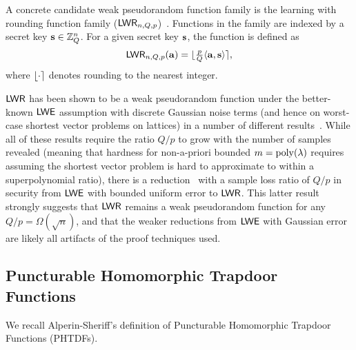 A concrete candidate weak pseudorandom function family is the learning with
rounding function family
($\mathsf{LWR}_{n,Q,p}$)~\cite{DBLP:conf/eurocrypt/BanerjeePR12}.
Functions in the family are indexed by a secret key $\mathbf{s} \in
\mathbb{Z}_Q^n$. For a given secret key $\mathbf{s}$, the function  is defined as 
\[\mathsf{LWR}_{n,Q,p}(\mathbf{a})=\lfloor\tfrac{p}{Q}\langle\mathbf{a},\mathbf{s}\rangle\rceil,\]
where $\lfloor\cdot\rceil$ denotes rounding to the nearest integer. 

$\mathsf{LWR}$ has been shown to be a weak pseudorandom function under the
better-known $\mathsf{LWE}$ assumption with discrete Gaussian noise terms (and hence on worst-case shortest
vector problems on lattices) in a number of different results~\cite{DBLP:conf/eurocrypt/BanerjeePR12,DBLP:conf/crypto/AlwenKPW13,cryptoeprint:2016:589,DBLP:conf/tcc/BogdanovGMRR16,DBLP:conf/asiacrypt/BaiLLSS15}. While
all of these results require the ratio $Q/p$ to grow with the number
of samples revealed (meaning that hardness for non-a-priori bounded
$m=\operatorname{poly}(\lambda)$ requires assuming the shortest vector problem is hard
to approximate to within a superpolynomial ratio), there is a
reduction~\cite{DBLP:conf/tcc/BogdanovGMRR16} with a sample loss ratio of $Q/p$ in
security from $\mathsf{LWE}$ with bounded uniform error to $\mathsf{LWR}$. This latter result
strongly suggests that $\mathsf{LWR}$ remains a weak pseudorandom function
for any $Q/p=\Omega(\sqrt{n})$, and that the weaker reductions from
$\mathsf{LWE}$ with Gaussian error are likely all artifacts of the proof
techniques used.

\subsection{Puncturable Homomorphic Trapdoor Functions}
\label{sec:punct-homom-trapd}
We recall Alperin-Sheriff's definition of Puncturable Homomorphic
Trapdoor Functions (PHTDFs). 

